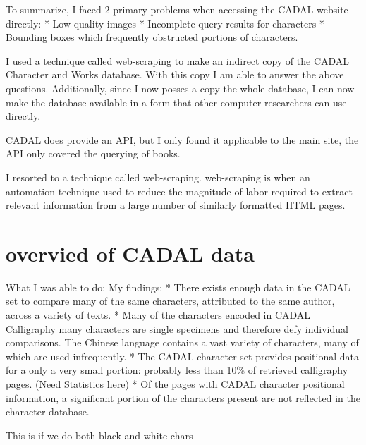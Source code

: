     To summarize, I faced 2 primary problems when accessing the CADAL website directly:
        *  Low quality images
        *  Incomplete query results for characters
        *  Bounding boxes which frequently obstructed portions of characters.
                    

I used a technique called web-scraping to make an indirect copy of the CADAL Character and Works database.  With this copy I am able to answer the above questions.  Additionally, since I now posses a copy the whole database, I can now make the database available in a form that other computer researchers can use directly.


    CADAL does provide an API, but I only found it applicable to the main site, the API only covered the querying of books.



   I resorted to a technique called web-scraping.  web-scraping is when an automation technique used to reduce the magnitude of labor required to extract relevant information from a large number of similarly formatted HTML pages.






\chapter{overvied of CADAL data}
What I was able to do:
    My findings:
        * There exists enough data in the CADAL set to compare many of the same characters, attributed to the same author, across a variety of texts.
        *  Many of the characters encoded in CADAL Calligraphy many characters are single specimens and therefore defy individual comparisons.  The Chinese language contains a vast variety of characters, many of which are used infrequently.
        *  The CADAL character set provides positional data for a only a very small portion: probably less than 10\% of retrieved calligraphy pages.  (Need Statistics here)
        *  Of the pages with CADAL character positional information, a significant portion of the characters present are not reflected in the character database.
        
        This  is if we do both black and white chars


    
